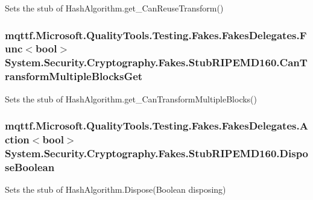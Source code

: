 Sets the stub of Hash\-Algorithm.\-get\-\_\-\-Can\-Reuse\-Transform()

\hypertarget{class_system_1_1_security_1_1_cryptography_1_1_fakes_1_1_stub_r_i_p_e_m_d160_a6b32a3c7570af2d1513996757c8a13e5}{
\subsubsection[{Can\-Transform\-Multiple\-Blocks\-Get}]{\setlength{\rightskip}{0pt plus 5cm}mqttf.\-Microsoft.\-Quality\-Tools.\-Testing.\-Fakes.\-Fakes\-Delegates.\-Func$<$bool$>$ System.\-Security.\-Cryptography.\-Fakes.\-Stub\-R\-I\-P\-E\-M\-D160.\-Can\-Transform\-Multiple\-Blocks\-Get}}\label{class_system_1_1_security_1_1_cryptography_1_1_fakes_1_1_stub_r_i_p_e_m_d160_a6b32a3c7570af2d1513996757c8a13e5}


Sets the stub of Hash\-Algorithm.\-get\-\_\-\-Can\-Transform\-Multiple\-Blocks()

\hypertarget{class_system_1_1_security_1_1_cryptography_1_1_fakes_1_1_stub_r_i_p_e_m_d160_a72266197f27bbe9e716690c8b320f4da}{
\subsubsection[{Dispose\-Boolean}]{\setlength{\rightskip}{0pt plus 5cm}mqttf.\-Microsoft.\-Quality\-Tools.\-Testing.\-Fakes.\-Fakes\-Delegates.\-Action$<$bool$>$ System.\-Security.\-Cryptography.\-Fakes.\-Stub\-R\-I\-P\-E\-M\-D160.\-Dispose\-Boolean}}\label{class_system_1_1_security_1_1_cryptography_1_1_fakes_1_1_stub_r_i_p_e_m_d160_a72266197f27bbe9e716690c8b320f4da}


Sets the stub of Hash\-Algorithm.\-Dispose(\-Boolean disposing)


